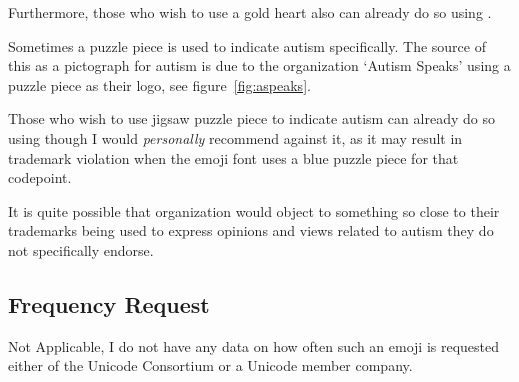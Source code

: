 Furthermore, those who wish to use a gold heart also can already do so using \goldheart{}.

Sometimes a puzzle piece is used to indicate autism specifically. The source of this as a pictograph
for autism is due to the organization `Autism Speaks' using a puzzle piece as their logo, see
figure~\ref{fig:aspeaks}.

Those who wish to use jigsaw puzzle piece to indicate autism can already do so using \jigsawemoji{}
though I would \emph{personally} recommend against it, as it may result in trademark violation when
the emoji font uses a blue puzzle piece for that codepoint.

It is quite possible that organization would object to something so close to their trademarks
being used to express opinions and views related to autism they do not specifically endorse.

\subsection{Frequency Request}

Not Applicable, I do not have any data on how often such an emoji is requested either of the
Unicode Consortium or a Unicode member company.
